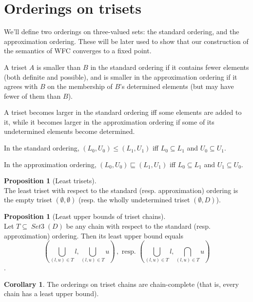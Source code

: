 \documentclass[oneside,12pt]{book}
\theoremstyle{definition}
\newtheorem{corollary}[theorem]{Corollary}
\newtheorem{proposition}[theorem]{Proposition}
\theoremstyle{remark}
\newcommand\var[1]{\mathop{\mathit{#1}}\nolimits}
\newcommand{\approximates}{\sqsubseteq}
\newcommand{\SetIII}{\var{Set3}}
\begin{document}
\section{Orderings on trisets}
We'll define two orderings on three-valued sets: the standard ordering,
and the approximation ordering. These will be later used to show that our
construction of the semantics of WFC converges to a fixed point.

A triset $A$ is smaller than $B$ in the standard ordering if it contains fewer elements
(both definite and possible), and is smaller in the approximation ordering
if it agrees with $B$ on the membership of $B$'s determined elements (but may
have fewer of them than $B$).

A triset becomes larger in the standard ordering iff some elements are added to it,
while it becomes larger in the approximation ordering if some of its undetermined
elements become determined.

\begin{defBox}
  In the standard ordering, $(L_0, U_0) \leq (L_1, U_1)$ iff $L_0 \subseteq L_1$
  and $U_0 \subseteq U_1$.
  
  \medskip \noindent
  In the approximation ordering, $(L_0, U_0) \approximates (L_1, U_1)$
  iff $L_0 \subseteq L_1$ and $U_1 \subseteq U_0$.
\end{defBox}

\begin{proposition}[Least trisets] \label{leastTrisets} \hfill \\
  The least triset with respect to the standard (resp. approximation) ordering
  is the empty triset $(\emptyset, \emptyset)$ (resp. the wholly undetermined
  triset $(\emptyset, D)$).
\end{proposition}

\begin{proposition}[Least upper bounds of triset chains]
\label{leastUpperBoundsTrisets} \hfill \\
  Let $T \subseteq \SetIII(D)$ be any chain with respect to the standard
  (resp. approximation) ordering. Then its least upper bound equals
  \[(\bigcup_{(l,u) \in T}l,\bigcup_{(l,u) \in T}u)\,,
  \text{ resp. } (\bigcup_{(l,u) \in T}l,\bigcap_{(l,u) \in T}u)\].
\end{proposition}

\begin{corollary}
  The orderings on triset chains are chain-complete (that is, every chain has
  a least upper bound).
\end{corollary}
\end{document}
